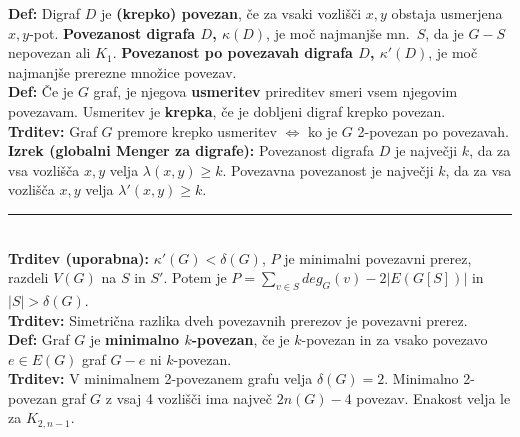 \documentclass[a4paper,10pt]{article}
\theoremstyle{definition}
\let\oldtextbf\textbf
\renewcommand{\textbf}[1]{\oldtextbf{\boldmath #1}}
\newcommand{\rlsep}{\rule{0.5 \textwidth}{.1pt}}
\begin{document}
\textbf{Def:} Digraf $D$ je \textbf{(krepko) povezan}, če za vsaki vozlišči $x, y$ obstaja usmerjena $x,y$-pot. \textbf{Povezanost digrafa $D$, $\kappa(D)$}, je moč najmanjše mn.\ $S$, da je $G-S$ nepovezan ali $K_1$. \textbf{Povezanost po povezavah digrafa $D$, $\kappa'(D)$}, je moč najmanjše prerezne množice povezav.\\
\textbf{Def:} Če je $G$ graf, je njegova \textbf{usmeritev} prireditev smeri vsem njegovim povezavam. Usmeritev je \textbf{krepka}, če je dobljeni digraf krepko povezan.\\
\textbf{Trditev:} Graf $G$ premore krepko usmeritev $\iff$ ko je $G$ 2-povezan po povezavah.\\
\textbf{Izrek (globalni Menger za digrafe):} Povezanost digrafa $D$ je največji $k$, da za vsa vozlišča $x, y$ velja $\lambda(x, y) \geq k$. Povezavna povezanost je največji $k$, da za vsa vozlišča $x, y$ velja $\lambda'(x, y) \geq k$.\\
\rlsep\\
\textbf{Trditev (uporabna):} $\kappa'(G) < \delta(G)$, $P$ je minimalni povezavni prerez, razdeli $V(G)$ na $S$ in $S'$. Potem je $P = \sum_{v \in S} deg_G(v) - 2 |E(G[S])|$ in $|S| > \delta(G)$.\\
\textbf{Trditev:} Simetrična razlika dveh povezavnih prerezov je povezavni prerez.\\
\textbf{Def:} Graf $G$ je \textbf{minimalno $k$-povezan}, če je $k$-povezan in za vsako povezavo $e \in E(G)$ graf $G - e$ ni $k$-povezan.\\
\textbf{Trditev:} V minimalnem 2-povezanem grafu velja $\delta(G) = 2$. Minimalno 2-povezan graf $G$ z vsaj 4 vozlišči ima največ $2 n(G) - 4$ povezav. Enakost velja le za $K_{2, n-1}$.\\
\end{document}
